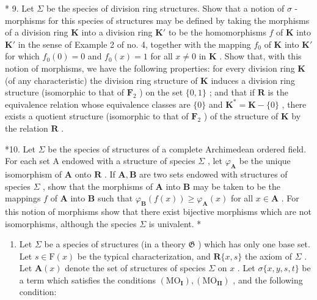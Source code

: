 * 9. Let \(\Sigma\) be the species of division ring structures. Show that a notion of \(\sigma\) -morphisms for this species of structures may be defined by taking the morphisms of a division ring \(\mathbf{K}\) into a division ring \(\mathbf{K}'\) to be the homomorphisms \(f\) of \(\mathbf{K}\) into \(\mathbf{K}'\) in the sense of Example 2 of no. 4, together with the mapping \(f_0\) of \(\mathbf{K}\) into \(\mathbf{K}'\) for which \(f_0(0) = 0\) and \(f_0(x) = 1\) for all \(x \neq 0\) in \(\mathbf{K}\) . Show that, with this notion of morphisms, we have the following properties: for every division ring \(\mathbf{K}\) (of any characteristic) the division ring structure of \(\mathbf{K}\) induces a division ring structure (isomorphic to that of \(\mathbf{F}_2\) ) on the set \(\{0, 1\}\) ; and that if \(\mathbf{R}\) is the equivalence relation whose equivalence classes are \(\{0\}\) and \(\mathbf{K}^* = \mathbf{K} - \{0\}\) , there exists a quotient structure (isomorphic to that of \(\mathbf{F}_2\) ) of the structure of \(\mathbf{K}\) by the relation \(\mathbf{R}\) .

*10. Let \(\Sigma\) be the species of structures of a complete Archimedean ordered field. For each set A endowed with a structure of species \(\Sigma\) , let \(\varphi_{\mathbf{A}}\) be the unique isomorphism of \(\mathbf{A}\) onto \(\mathbf{R}\) . If \(\mathbf{A}, \mathbf{B}\) are two sets endowed with structures of species \(\Sigma\) , show that the morphisms of \(\mathbf{A}\) into \(\mathbf{B}\) may be taken to be the mappings \(f\) of \(\mathbf{A}\) into \(\mathbf{B}\) such that \(\varphi_{\mathbf{B}}(f(x)) \geqslant \varphi_{\mathbf{A}}(x)\) for all \(x \in \mathbf{A}\) . For this notion of morphisms show that there exist bijective morphisms which are not isomorphisms, although the species \(\Sigma\) is univalent. *

\begin{enumerate}
\def\labelenumi{\arabic{enumi}.}
\setcounter{enumi}{10}
\tightlist
\item
  Let \(\Sigma\) be a species of structures (in a theory \(\mathfrak{G}\) ) which has only one base set. Let \(s \in \mathrm{F}(x)\) be the typical characterization, and \(\mathbf{R}\{x, s\}\) the axiom of \(\Sigma\) . Let \(\mathbf{A}(x)\) denote the set of structures of species \(\Sigma\) on \(x\) . Let \(\sigma\{x, y, s, t\}\) be a term which satisfies the conditions \((\mathrm{MO}_{\mathbf{I}}), (\mathrm{MO}_{\mathbf{II}})\) , and the following condition:
\end{enumerate}

